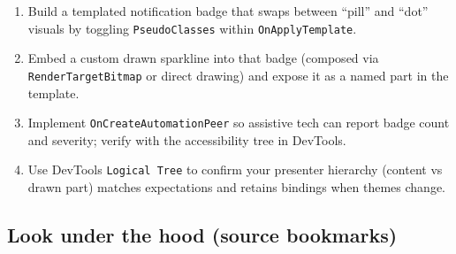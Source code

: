 \begin{enumerate}
\def\labelenumi{\arabic{enumi}.}
\tightlist
\item
  Build a templated notification badge that swaps between ``pill'' and
  ``dot'' visuals by toggling \passthrough{\lstinline!PseudoClasses!}
  within \passthrough{\lstinline!OnApplyTemplate!}.
\item
  Embed a custom drawn sparkline into that badge (composed via
  \passthrough{\lstinline!RenderTargetBitmap!} or direct drawing) and
  expose it as a named part in the template.
\item
  Implement \passthrough{\lstinline!OnCreateAutomationPeer!} so
  assistive tech can report badge count and severity; verify with the
  accessibility tree in DevTools.
\item
  Use DevTools \passthrough{\lstinline!Logical Tree!} to confirm your
  presenter hierarchy (content vs drawn part) matches expectations and
  retains bindings when themes change.
\end{enumerate}

\subsection{Look under the hood (source
bookmarks)}\label{look-under-the-hood-source-bookmarks-21}

